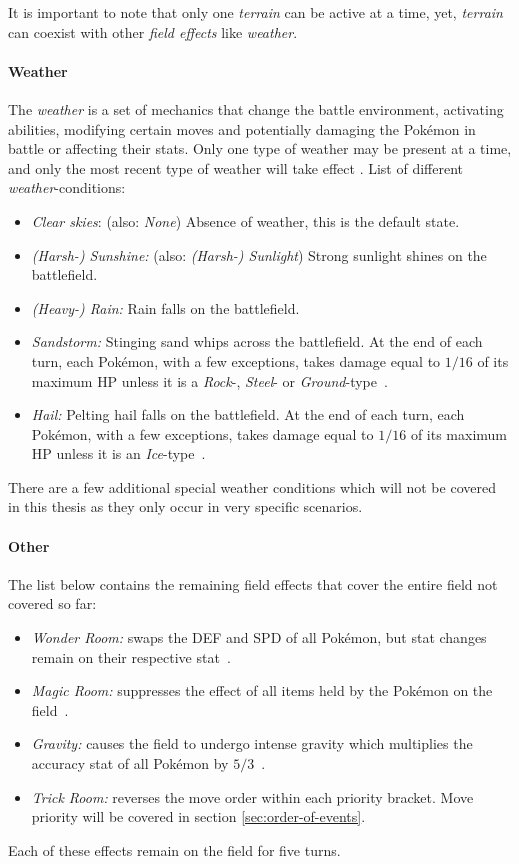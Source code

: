 It is important to note that only one \textit{terrain} can be active at a time, yet, \textit{terrain}
can coexist with other \textit{field effects} like \textit{weather}.

\paragraph{Weather}
The \textit{weather} is a set of mechanics that change the battle environment, activating abilities, modifying
certain moves and potentially damaging the Pokémon in battle or affecting their stats. Only one type of weather may 
be present at a time, and only the most recent type of weather will take effect \cite{Bulbapedia:Weather}. List
of different \textit{weather}-conditions:
\begin{itemize}
	\item \textit{Clear skies}: (also: \emph{None}) Absence of weather, this is the default state.
	\item \textit{(Harsh-) Sunshine:} (also: \emph{(Harsh-) Sunlight}) Strong sunlight shines on the 
	battlefield.
	\item \textit{(Heavy-) Rain:} Rain falls on the battlefield.
	\item \textit{Sandstorm:} Stinging sand whips across the battlefield. At the end of each turn, each
	Pokémon, with a few exceptions, takes damage equal to $1/16$ of its maximum \ac{HP} unless it is 
	a \textit{Rock}-, \textit{Steel}- or
	\textit{Ground}-type~\autocite{Bulbapedia:SandstormWeather}.
	\item \textit{Hail:} Pelting hail falls on the battlefield. At the end of each turn, each
	Pokémon, with a few exceptions, takes damage equal to $1/16$ of its maximum \ac{HP} unless it is an 
	\textit{Ice}-type~\autocite{Bulbapedia:HailWeather}.
\end{itemize}
There are a few additional special weather conditions which will not be covered in this thesis as they only occur in 
very specific scenarios.

\paragraph{Other}
The list below contains the remaining field effects that cover the entire field not covered so far:
\begin{itemize}
	\item \textit{Wonder Room:} swaps the \ac{DEF} and \ac{SPD} of all Pokémon, but stat changes
	remain on their respective stat~\autocite{Bulbapedia:WonderRoom}. 
	\item \textit{Magic Room:} suppresses the effect of all items held by the Pokémon on the field~\autocite{Bulbapedia:MagicRoom}.
	\item \textit{Gravity:} causes the field to undergo intense gravity which multiplies the accuracy stat of
	all Pokémon by $5/3$~\autocite{Bulbapedia:Gravity}.
	\item \textit{Trick Room:} reverses the move order within each priority bracket. Move priority will be covered
	in section \ref{sec:order-of-events}.
\end{itemize}
Each of these effects remain on the field for five turns.

